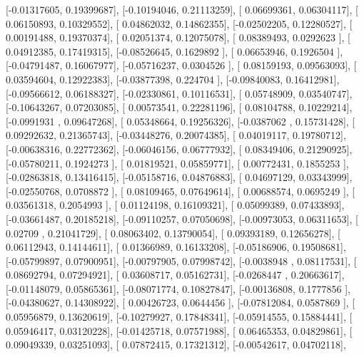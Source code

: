 \documentclass{article}
\begin{document}
       [-0.01317605,  0.19399687],
       [-0.10194046,  0.21113259],
       [ 0.06699361,  0.06304117],
       [ 0.06150893,  0.10329552],
       [ 0.04862032,  0.14862355],
       [-0.02502205,  0.12280527],
       [ 0.00191488,  0.19370374],
       [ 0.02051374,  0.12075078],
       [ 0.08389493,  0.0292623 ],
       [ 0.04912385,  0.17419315],
       [-0.08526645,  0.1629892 ],
       [ 0.06653946,  0.1926504 ],
       [-0.04791487,  0.16067977],
       [-0.05716237,  0.0304526 ],
       [ 0.08159193,  0.09563093],
       [ 0.03594604,  0.12922383],
       [-0.03877398,  0.224704  ],
       [-0.09840083,  0.16412981],
       [-0.09566612,  0.06188327],
       [-0.02330861,  0.10116531],
       [ 0.05748909,  0.03540747],
       [-0.10643267,  0.07203085],
       [ 0.00573541,  0.22281196],
       [ 0.08104788,  0.10229214],
       [-0.0991931 ,  0.09647268],
       [ 0.05348664,  0.19256326],
       [-0.0387062 ,  0.15731428],
       [ 0.09292632,  0.21365743],
       [-0.03448276,  0.20074385],
       [ 0.04019117,  0.19780712],
       [-0.00638316,  0.22772362],
       [-0.06046156,  0.06777932],
       [ 0.08349406,  0.21290925],
       [-0.05780211,  0.1924273 ],
       [ 0.01819521,  0.05859771],
       [ 0.00772431,  0.1855253 ],
       [-0.02863818,  0.13416415],
       [-0.05158716,  0.04876883],
       [ 0.04697129,  0.03343999],
       [-0.02550768,  0.0708872 ],
       [ 0.08109465,  0.07649614],
       [ 0.00688574,  0.0695249 ],
       [ 0.03561318,  0.2054993 ],
       [ 0.01124198,  0.16109321],
       [ 0.05099389,  0.07433893],
       [-0.03661487,  0.20185218],
       [-0.09110257,  0.07050698],
       [-0.00973053,  0.06311653],
       [ 0.02709   ,  0.21041729],
       [ 0.08063402,  0.13790054],
       [ 0.09393189,  0.12656278],
       [ 0.06112943,  0.14144611],
       [ 0.01366989,  0.16133208],
       [-0.05186906,  0.19508681],
       [-0.05799897,  0.07900951],
       [-0.00797905,  0.07998742],
       [-0.0038948 ,  0.08117531],
       [ 0.08692794,  0.07294921],
       [ 0.03608717,  0.05162731],
       [-0.0268447 ,  0.20663617],
       [-0.01148079,  0.05865361],
       [-0.08071774,  0.10827847],
       [-0.00136808,  0.1777856 ],
       [-0.04380627,  0.14308922],
       [ 0.00426723,  0.0644456 ],
       [-0.07812084,  0.0587869 ],
       [ 0.05956879,  0.13620619],
       [-0.10279927,  0.17848341],
       [-0.05914555,  0.15884441],
       [ 0.05946417,  0.03120228],
       [-0.01425718,  0.07571988],
       [ 0.06465353,  0.04829861],
       [ 0.09049339,  0.03251093],
       [ 0.07872415,  0.17321312],
       [-0.00542617,  0.04702118],
\end{document}
